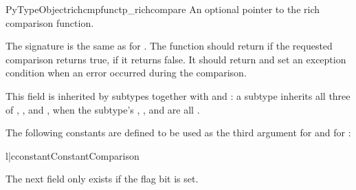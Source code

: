 \begin{cmemberdesc}{PyTypeObject}{richcmpfunc}{tp_richcompare}
  An optional pointer to the rich comparison function.

  The signature is the same as for .
  The function should return  if the requested comparison
  returns true,  if it returns false.  It should return
   and set an exception condition when an error occurred
  during the comparison.

  This field is inherited by subtypes together with
   and : a subtype inherits all
  three of , , and
  , when the subtype's ,
  , and  are all \NULL.

  The following constants are defined to be used as the third argument
  for  and for :

  \begin{tableii}{l|c}{constant}{Constant}{Comparison}
  \end{tableii}
\end{cmemberdesc}

The next field only exists if the 
flag bit is set.

